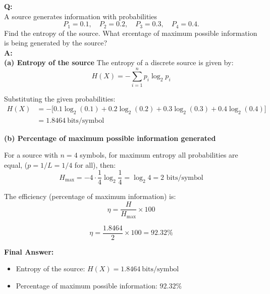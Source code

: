 \documentclass[11pt,a4paper]{book}
\newcounter{qna}[chapter]
\renewcommand{\theqna}{\thechapter.\arabic{qna}}
\newenvironment{questionanswerbox}{
    \refstepcounter{qna}%
    \begin{tcolorbox}[
        enhanced,
        breakable,
        colback=softlavender!10,
        colframe=softlavender!200,
        title={Example~\theqna}, %
        fonttitle=\bfseries,
        coltitle=white,
        colbacktitle=softlavender!200,
        sharp corners,
        boxrule=1pt,
        left=8pt,
        right=8pt,
        top=6pt,
        bottom=6pt
    ]
}{
    \end{tcolorbox}
}
\begin{document}
\begin{questionanswerbox}
\textbf{Q:}\\
A source generates information with probabilities
\[
P_1 = 0.1,\quad P_2 = 0.2,\quad P_3 = 0.3,\quad P_4 = 0.4.
\]
Find the entropy of the source. What ercentage of maximum possible information is being generated by the source?\\
\textbf{A:}\\

\textbf{(a) Entropy of the source}
The entropy of a discrete source is given by:
\[
H(X) = -\sum_{i=1}^{n} p_i \log_2 p_i
\]

Substituting the given probabilities:
\begin{align*}
H(X)
&= -\Big[
0.1\log_2(0.1)
+ 0.2\log_2(0.2)
+ 0.3\log_2(0.3)
+ 0.4\log_2(0.4)
\Big] \\
&= 1.8464 \ \text{bits/symbol}
\end{align*}

\textbf{(b) Percentage of maximum possible information generated}

For a source with \(n=4\) symbols, for maximum entropy all probabilities are equal, (\(p = 1/L = 1/4\) for all), then:
\[
H_{\max} = -4 \cdot \frac{1}{4}\log_2 \frac{1}{4} = \log_2 4 = 2 \text{ bits/symbol}
\]

The efficiency (percentage of maximum information) is:
\[
\eta = \frac{H}{H_{\max}} \times 100
\]

\[
\eta = \frac{1.8464}{2} \times 100 = 92.32\%
\]

\textbf{Final Answer:}
\begin{itemize}
    \item Entropy of the source: \(\boxed{H(X) = 1.8464 \ \text{bits/symbol}}\)
    \item Percentage of maximum possible information: \(\boxed{92.32\%}\)
\end{itemize}

\end{questionanswerbox}
\end{document}
